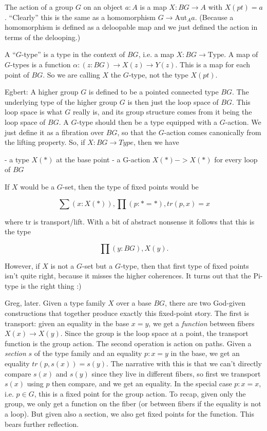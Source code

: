 \documentclass[12pt]{article}
\newcommand{\Aut}{\mathrm{Aut}}
\newcommand{\Type}{\mathrm{Type}}
\begin{document}
The action of a group $G$ on an object $a : A$ is a map $X: BG \to A$ with $X(pt) = a$. ``Clearly'' this is the same as a homomorphism $G \to \Aut_A a$. (Because a homomorphism is defined as a deloopable map and we just defined the action in terms of the delooping.)

A ``$G$-type'' is a type in the context of $BG$, i.e. a map $X : BG \to \Type$. A map of $G$-types is a function $\alpha : (z : BG) \to X(z) \to Y(z)$. This is a map for each point of $BG$. So we are calling $X$ the $G$-type, not the type $X(pt)$.

Egbert: A higher group $G$ is defined to be a pointed connected type $BG$. The underlying type of the higher group $G$ is then just the loop space of $BG$. This loop space is what $G$ really is, and its group structure comes from it being the loop space of $BG$. A $G$-type should then be a type equipped with a $G$-action. We just define it as a fibration over $BG$, so that the $G$-action comes canonically from the lifting property. So, if $X : BG \to Type$, then we have

- a type $X(*)$ at the base point
- a G-action $X(*) -> X(*)$ for every loop of $BG$

If $X$ would be a $G$-set, then the type of fixed points would be

$$\sum (x : X(*)), \prod (p : * = *), tr(p,x) = x$$

where tr is transport/lift. With a bit of abstract nonsense it follows that this is the type

$$\prod (y : BG), X(y).$$

However, if $X$ is not a $G$-set but a $G$-type, then that first type of fixed points isn't quite right, because it misses the higher coherences. It turns out that the Pi-type is the right thing :)

Greg, later. Given a type family $X$ over a base $BG$, there are two God-given constructions that together produce exactly this fixed-point story. The first is transport: given an equality in the base $x = y$, we get a \emph{function} between fibers $X(x)\to X(y)$. Since the group is the loop space at a point, the transport function is the group action. The second operation is action on paths. Given a \emph{section} $s$  of the type family and an equality $p : x = y$ in the base, we get an equality $tr(p, s(x)) = s(y)$. The narrative with this is that we can't directly compare $s(x)$ and $s(y)$ since they live in different fibers, so first we transport $s(x)$ using $p$ then compare, and we get an equality. In the special case $p : x = x$, i.e. $p \in G$, this is a fixed point for the group action. To recap, given only the group, we only get a function on the fiber (or between fibers if the equality is not a loop). But given also a section, we also get fixed points for the function. This bears further reflection.
\end{document}
